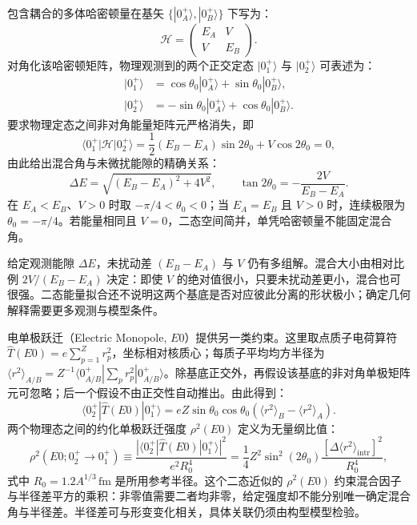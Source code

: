 包含耦合的多体哈密顿量在基矢 $\{|0^+_A\rangle, |0^+_B\rangle\}$ 下写为：
\begin{equation}\label{eq:4-2-two-state-H}
\mathcal{H} = \begin{pmatrix} E_A & V \\ V & E_B \end{pmatrix}.
\end{equation}
对角化该哈密顿矩阵，物理观测到的两个正交定态 $|0^+_1\rangle$ 与 $|0^+_2\rangle$ 可表述为：
\begin{equation}\label{eq:4-2-two-state-states}
\begin{aligned}
|0^+_1\rangle &= \cos\theta_0 |0^+_A\rangle + \sin\theta_0 |0^+_B\rangle, \\
|0^+_2\rangle &= -\sin\theta_0 |0^+_A\rangle + \cos\theta_0 |0^+_B\rangle.
\end{aligned}
\end{equation}
要求物理定态之间非对角能量矩阵元严格消失，即
\begin{equation*}
\langle 0^+_1 | \mathcal{H} | 0^+_2 \rangle = \frac{1}{2}(E_B - E_A)\sin 2\theta_0 + V\cos 2\theta_0 = 0 ,
\end{equation*}
由此给出混合角与未微扰能隙的精确关系：
\begin{equation}\label{eq:4-2-two-state-mixing}
\Delta E = \sqrt{(E_B - E_A)^2 + 4V^2}, \qquad \tan 2\theta_0 = -\frac{2V}{E_B - E_A}.
\end{equation}
在 $E_A<E_B$、$V>0$ 时取 $-\pi/4<\theta_0<0$；当 $E_A=E_B$ 且 $V>0$ 时，连续极限为 $\theta_0=-\pi/4$。若能量相同且 $V=0$，二态空间简并，单凭哈密顿量不能固定混合角。

给定观测能隙 $\Delta E$，未扰动差 $(E_B-E_A)$ 与 $V$ 仍有多组解。混合大小由相对比例 $2V/(E_B-E_A)$ 决定：即使 $V$ 的绝对值很小，只要未扰动差更小，混合也可很强。二态能量拟合还不说明这两个基底是否对应彼此分离的形状极小；确定几何解释需要更多观测与模型条件。

电单极跃迁（Electric Monopole, $E0$）提供另一类约束。这里取点质子电荷算符 $\hat T(E0)=e\sum_{p=1}^{Z}r_p^2$，坐标相对核质心；每质子平均均方半径为 $\langle r^2\rangle_{A/B}=Z^{-1}\langle 0^+_{A/B}|\sum_p r_p^2|0^+_{A/B}\rangle$。除基底正交外，再假设该基底的非对角单极矩阵元可忽略；后一个假设不由正交性自动推出。由此得到：
\begin{equation}\label{eq:4-2-e0-matrix}
\langle 0^+_2 | \hat{T}(E0) | 0^+_1 \rangle = eZ\sin\theta_0\cos\theta_0\left(\langle r^2\rangle_B-\langle r^2\rangle_A\right).
\end{equation}
两个物理态之间的约化单极跃迁强度 $\rho^2(E0)$ 定义为无量纲比值：
\begin{equation}\label{eq:4-2-rho-e0-diff}
\rho^2(E0; 0^+_2 \to 0^+_1) \equiv \frac{|\langle 0^+_2 | \hat{T}(E0) | 0^+_1 \rangle|^2}{e^2 R_0^4} = \frac{1}{4} Z^2 \sin^2(2\theta_0) \frac{\left[ \Delta\langle r^2 \rangle_{\mathrm{intr}} \right]^2}{R_0^4},
\end{equation}
式中 $R_0=1.2A^{1/3}\,\mathrm{fm}$ 是所用参考半径。这个二态近似的 $\rho^2(E0)$ 约束混合因子与半径差平方的乘积：非零值需要二者均非零，给定强度却不能分别唯一确定混合角与半径差。半径差可与形变变化相关，具体关联仍须由构型模型检验。


